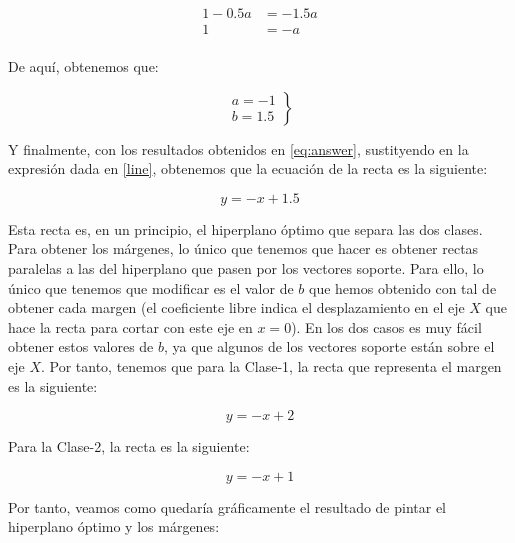 \documentclass[11pt,a4paper]{article}
\begin{document}
\begin{equation}
\begin{aligned}
1 - 0.5a &= -1.5a \\
1 &= -a \\
\end{aligned}
\end{equation}

De aquí, obtenemos que:

\begin{equation}
\label{eq:answer}
\left.
\begin{aligned}
a = -1 \\
b = 1.5
\end{aligned}
\right\rbrace
\end{equation}

Y finalmente, con los resultados obtenidos en \eqref{eq:answer}, sustityendo en la expresión dada en \eqref{line}, obtenemos que la
ecuación de la recta es la siguiente:

\begin{equation}
y = -x + 1.5
\end{equation}

Esta recta es, en un principio, el hiperplano óptimo que separa las dos clases. Para obtener los márgenes, lo único que tenemos que
hacer es obtener rectas paralelas a las del hiperplano que pasen por los vectores soporte. Para ello, lo único que tenemos que
modificar es el valor de $b$ que hemos obtenido con tal de obtener cada margen (el coeficiente libre indica el desplazamiento
en el eje $X$ que hace la recta para cortar con este eje en $x = 0$). En los dos casos es muy fácil obtener estos valores de $b$,
ya que algunos de los vectores soporte están sobre el eje $X$. Por tanto, tenemos que para la Clase-1, la recta que representa el
margen es la siguiente:

\begin{equation}
y = -x + 2
\end{equation}

Para la Clase-2, la recta es la siguiente:

\begin{equation}
y = -x + 1
\end{equation}

Por tanto, veamos como quedaría gráficamente el resultado de pintar el hiperplano óptimo y los márgenes:
\end{document}
